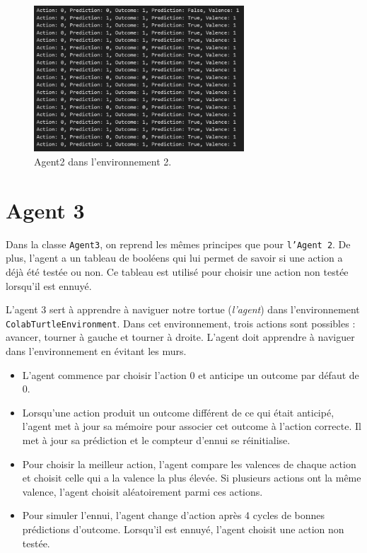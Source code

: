\documentclass[a4paper, 12pt]{article}
\begin{document}
\begin{figure}[h]
    \centering
    \includegraphics[width=0.7\textwidth]{ReportImages/Agent2/Agent2_Env2.png}
    \caption{Agent2 dans l'environnement 2.}
    \label{fig:agent2_env2}
\end{figure}

\vspace{-20pt}

\section{Agent 3}

\hspace*{\parindent} Dans la classe \texttt{Agent3}, on reprend les mêmes principes que pour \texttt{l'Agent 2}. De plus, l'agent a un tableau de booléens qui lui permet de savoir si une action a déjà été testée ou non. Ce tableau est utilisé pour choisir une action non testée lorsqu'il est ennuyé.

\vspace{10pt}

L'agent 3 sert à apprendre à naviguer notre tortue (\textit{l'agent}) dans l'environnement \texttt{ColabTurtleEnvironment}. Dans cet environnement, trois actions sont possibles : avancer, tourner à gauche et tourner à droite. L'agent doit apprendre à naviguer dans l'environnement en évitant les murs.

\newpage

\begin{itemize}
    \item L'agent commence par choisir l'action 0 et anticipe un outcome par défaut de 0.
    \item Lorsqu'une action produit un outcome différent de ce qui était anticipé, l'agent met à jour sa mémoire pour associer cet outcome à l'action correcte. Il met à jour sa prédiction et le compteur d'ennui se réinitialise.
    \item Pour choisir la meilleur action, l'agent compare les valences de chaque action et choisit celle qui a la valence la plus élevée. Si plusieurs actions ont la même valence, l'agent choisit aléatoirement parmi ces actions.
    \item Pour simuler l'ennui, l'agent change d'action après 4 cycles de bonnes prédictions d'outcome. Lorsqu'il est ennuyé, l'agent choisit une action non testée.
\end{itemize}
\end{document}
